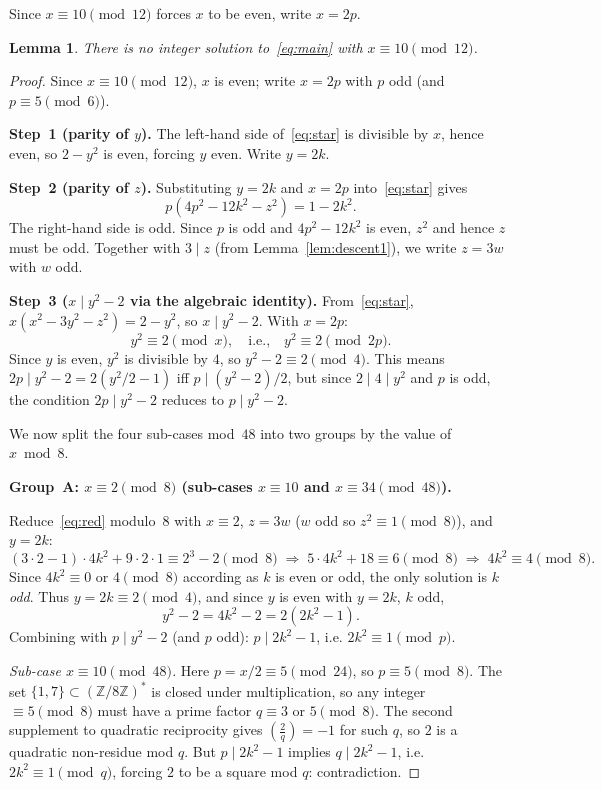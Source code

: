 \documentclass[12pt,a4paper]{article}
\newtheorem{lemma}[theorem]{Lemma}
\theoremstyle{definition}
\begin{document}
Since $x\equiv 10\pmod{12}$ forces $x$ to be even, write $x = 2p$.

\begin{lemma}\label{lem:case1f}
  There is no integer solution to~\eqref{eq:main} with $x \equiv 10 \pmod{12}$.
\end{lemma}

\begin{proof}
Since $x \equiv 10\pmod{12}$, $x$ is even; write $x = 2p$ with $p$ odd
(and $p \equiv 5\pmod{6}$).

\textbf{Step~1 (parity of $y$).}
The left-hand side of~\eqref{eq:star} is divisible by $x$, hence even, so
$2 - y^2$ is even, forcing $y$ even.  Write $y = 2k$.

\textbf{Step~2 (parity of $z$).}
Substituting $y = 2k$ and $x = 2p$ into~\eqref{eq:star} gives
\[
  p\!\left(4p^2 - 12k^2 - z^2\right) = 1 - 2k^2.
\]
The right-hand side is odd.  Since $p$ is odd and $4p^2 - 12k^2$ is even,
$z^2$ and hence $z$ must be odd.  Together with $3 \mid z$ (from
Lemma~\ref{lem:descent1}), we write $z = 3w$ with $w$ odd.

\textbf{Step~3 ($x \mid y^2-2$ via the algebraic identity).}
From~\eqref{eq:star}, $x(x^2-3y^2-z^2)=2-y^2$, so $x \mid y^2-2$.
With $x = 2p$:
\[
  y^2 \equiv 2 \pmod{x}, \quad\text{i.e.,}\quad y^2 \equiv 2 \pmod{2p}.
\]
Since $y$ is even, $y^2$ is divisible by $4$, so $y^2 - 2 \equiv 2
\pmod{4}$.  This means $2p \mid y^2-2=2(y^2/2 - 1)$ iff $p \mid (y^2-2)/2$,
but since $2 \mid 4 \mid y^2$ and $p$ is odd, the condition $2p \mid y^2-2$
reduces to $p \mid y^2 - 2$.

We now split the four sub-cases mod~$48$ into two groups by the value of~$x
\bmod 8$.

\medskip\noindent
\textbf{Group~A: $x \equiv 2\pmod{8}$
  (sub-cases $x \equiv 10$ and $x \equiv 34\pmod{48}$).}

Reduce~\eqref{eq:red} modulo~$8$ with $x \equiv 2$, $z = 3w$ ($w$ odd
so $z^2 \equiv 1\pmod 8$), and $y = 2k$:
\[
  (3\cdot 2-1)\cdot 4k^2 + 9\cdot 2\cdot 1 \equiv 2^3-2\pmod8
  \;\Longrightarrow\;
  5\cdot 4k^2 + 18 \equiv 6\pmod8
  \;\Longrightarrow\;
  4k^2 \equiv 4\pmod8.
\]
Since $4k^2 \equiv 0$ or $4\pmod 8$ according as $k$ is even or odd,
the only solution is $k$ \emph{odd}.  Thus $y = 2k \equiv 2\pmod{4}$,
and since $y$ is even with $y = 2k$, $k$ odd,
\[
  y^2 - 2 = 4k^2 - 2 = 2(2k^2-1).
\]
Combining with $p \mid y^2-2$ (and $p$ odd): $p \mid 2k^2-1$, i.e.
$2k^2 \equiv 1\pmod{p}$.

\textit{Sub-case $x\equiv 10\pmod{48}$.}
Here $p = x/2 \equiv 5\pmod{24}$, so $p \equiv 5\pmod{8}$.  The set
$\{1,7\} \subset (\mathbb{Z}/8\mathbb{Z})^*$ is closed under multiplication,
so any integer $\equiv 5\pmod{8}$ must have a prime factor $q \equiv 3$ or
$5\pmod{8}$.  The second supplement to quadratic reciprocity gives
$\left(\frac{2}{q}\right) = -1$ for such $q$, so $2$ is a quadratic
non-residue mod $q$.  But $p \mid 2k^2 - 1$ implies $q \mid 2k^2-1$,
i.e.\ $2k^2 \equiv 1\pmod{q}$, forcing $2$ to be a square mod $q$:
contradiction.


\end{proof}
\end{document}
